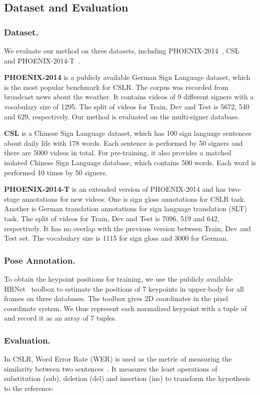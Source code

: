\documentclass[letterpaper]{article} \usepackage{aaai20}  \usepackage{times}  \usepackage{helvet} \usepackage{courier}  \usepackage[hyphens]{url}  \usepackage{graphicx} \urlstyle{rm} \def\UrlFont{\rm}  \usepackage{graphicx}  \frenchspacing  \setlength{\pdfpagewidth}{8.5in}  \setlength{\pdfpageheight}{11in}
\begin{document}
\subsection{Dataset and Evaluation}
\subsubsection{Dataset.}
We evaluate our method on three datasets, including PHOENIX-2014~\cite{phoenixdataset2014}, CSL~\cite{han,hlstm} and PHOENIX-2014-T~\cite{phoenix2014t}. 

\textbf{PHOENIX-2014} is a publicly available German Sign Language dataset, which is the most popular benchmark for CSLR. The corpus was recorded from broadcast news about the weather. It contains videos of 9 different signers with a vocabulary size of 1295. The split of videos for Train, Dev and Test is 5672, 540 and 629, respectively. Our method is evaluated on the multi-signer database.

\textbf{CSL} is a Chinese Sign Language dataset, which has 100 sign language sentences about daily life with 178 words. Each sentence is performed by 50 signers and there are 5000 videos in total. For pre-training, it also provides a matched isolated Chinese Sign Language database,  
which contains 500 words. Each word is performed 10 times by 50 signers. 

\textbf{PHOENIX-2014-T} is an extended version of PHOENIX-2014 and has two-stage annotations for new videos.
One is sign gloss annotations for CSLR task. Another is German translation annotations for sign language translation (SLT) task. The split of videos for Train, Dev and Test is 7096, 519 and 642, respectively. It has no overlap with the previous version between Train, Dev and Test set. The vocabulary size is 1115 for sign gloss and 3000 for German. 

\subsubsection{Pose Annotation.}
To obtain the keypoint positions for training, we use the publicly available HRNet~\cite{sun2019deep} toolbox to estimate the positions of 7 keypoints in upper-body for all frames on three databases. The toolbox gives 2D coordinates  in the pixel coordinate system. We thus represent each normalized keypoint with a tuple of  and record it as an array of 7 tuples.

\subsubsection{Evaluation.}
In CSLR, Word Error Rate (WER) is used as the metric of measuring the similarity between two sentences~\cite{phoenixdataset2014}. It measures the least operations of substitution (sub), deletion (del) and insertion (ins) to transform the hypothesis to the reference:
\end{document}
